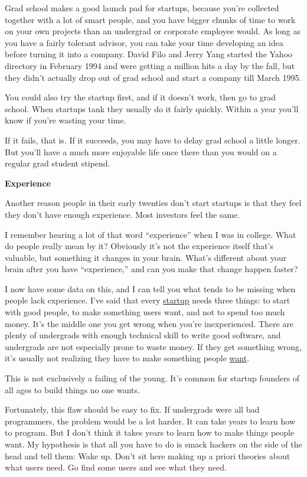 \documentclass[12pt]{book}
\begin{document}
Grad school makes a good launch pad for startups, because you're
collected together with a lot of smart people, and you have bigger
chunks of time to work on your own projects than an undergrad or
corporate employee would. As long as you have a fairly tolerant advisor,
you can take your time developing an idea before turning it into a
company. David Filo and Jerry Yang started the Yahoo directory in
February 1994 and were getting a million hits a day by the fall, but
they didn't actually drop out of grad school and start a company till
March 1995.

You could also try the startup first, and if it doesn't work, then go to
grad school. When startups tank they usually do it fairly quickly.
Within a year you'll know if you're wasting your time.

If it fails, that is. If it succeeds, you may have to delay grad school
a little longer. But you'll have a much more enjoyable life once there
than you would on a regular grad student stipend.

\textbf{Experience}

Another reason people in their early twenties don't start startups is
that they feel they don't have enough experience. Most investors feel
the same.

I remember hearing a lot of that word ``experience'' when I was in
college. What do people really mean by it? Obviously it's not the
experience itself that's valuable, but something it changes in your
brain. What's different about your brain after you have ``experience,''
and can you make that change happen faster?

I now have some data on this, and I can tell you what tends to be
missing when people lack experience. I've said that every
\href{start.html}{startup} needs three things: to start with good
people, to make something users want, and not to spend too much money.
It's the middle one you get wrong when you're inexperienced. There are
plenty of undergrads with enough technical skill to write good software,
and undergrads are not especially prone to waste money. If they get
something wrong, it's usually not realizing they have to make something
people \href{bronze.html}{want}.

This is not exclusively a failing of the young. It's common for startup
founders of all ages to build things no one wants.

Fortunately, this flaw should be easy to fix. If undergrads were all bad
programmers, the problem would be a lot harder. It can take years to
learn how to program. But I don't think it takes years to learn how to
make things people want. My hypothesis is that all you have to do is
smack hackers on the side of the head and tell them: Wake up. Don't sit
here making up a priori theories about what users need. Go find some
users and see what they need.
\end{document}
